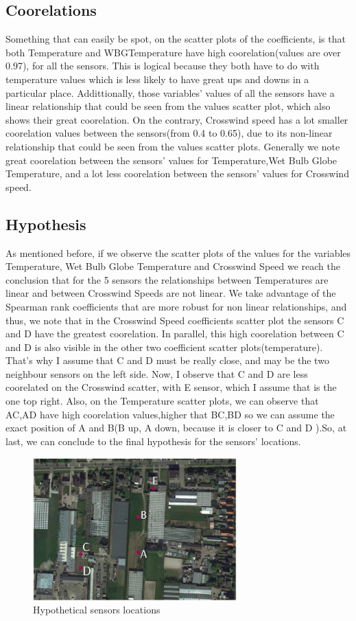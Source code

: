 \documentclass[a4paper,12pt]{article} %
\begin{document}
\subsection{Coorelations}
\setlength{\parindent}{8ex}Something that can easily be spot, on the scatter plots of the coefficients, is that both Temperature and WBGTemperature have high coorelation(values are over 0.97), for all the sensors. This is logical because they both have to do with temperature values which is less likely to have great ups and downs in a particular place. Addittionally, those variables' values of all the sensors have a linear relationship that could be seen from the values scatter plot, which also shows their great coorelation. On the contrary, Crosswind speed has a lot smaller coorelation values between the sensors(from 0.4 to 0.65), due to its non-linear relationship that could be seen from the values scatter plots. Generally we note great coorelation between the sensors' values for Temperature,Wet Bulb Globe Temperature, and a lot less coorelation between the sensors' values for Crosswind speed.
\subsection{Hypothesis}
\setlength{\parindent}{8ex}As mentioned before, if we observe the scatter plots of the values for the variables Temperature, Wet Bulb Globe Temperature and Crosswind Speed we reach the conclusion that for the 5 sensors the relationships between Temperatures are linear and between Crosswind Speeds are not linear. We take advantage of the Spearman rank coefficients that are more robust for non linear relationships, and thus, we note that in the Crosswind Speed coefficients scatter plot the sensors C and D have the greatest coorelation. In parallel, this high coorelation between C and D is also visible in the other two coefficient scatter plots(temperature). That's why I assume that  C and D must be really close, and may be the two neighbour sensors on the left side. Now, I observe that C and D are less coorelated on the Crosswind scatter, with E sensor, which I assume that is the one top right. Also, on the Temperature scatter plots, we can observe that AC,AD have high coorelation values,higher that BC,BD so we can assume the exact position of A and B(B up, A down, because it is closer to C and D ).So, at last, we can conclude to the final hypothesis for the sensors' locations.
\vspace{5mm}
\begin{figure}[H]   
	\centering 
	\includegraphics[width=0.7\textwidth]{Hypothesis.png}
	\caption{Hypothetical sensors locations} 
\end{figure}
\end{document}
